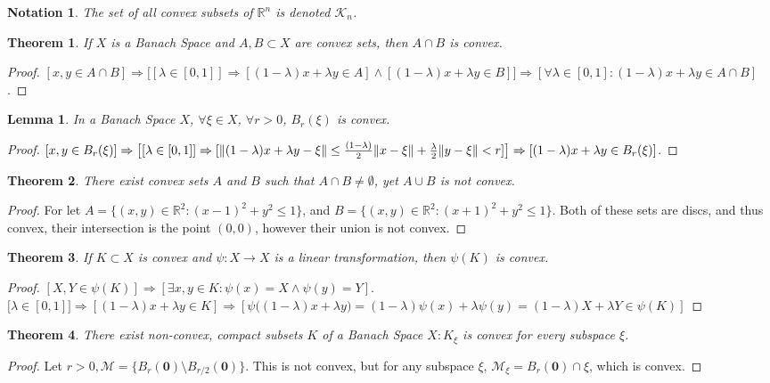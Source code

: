 \documentclass[12pt,oneside]{book}
\theoremstyle{mystyle}
\newtheorem{theorem}{Theorem}[section]
\newtheorem{lemma}{Lemma}[section]
\newtheorem{notation}{Notation}[section]
\begin{document}
\begin{notation}
The set of all convex subsets of $\mathbb{R}^n$ is denoted $\mathscr{K}_n$.
\end{notation}

\begin{theorem}
If $X$ is a Banach Space and $A,B\subset X$ are convex sets, then $A\cap B$ is convex.
\end{theorem}
\begin{proof}
$[x,y \in A\cap B] \Rightarrow \big[[\lambda \in [0,1]]\Rightarrow[ (1-\lambda)x+\lambda y \in A]\land [ (1-\lambda)x+\lambda y \in B]\big] \Rightarrow [\forall \lambda \in [0,1]:(1-\lambda)x+\lambda y \in A\cap B]$. 
\end{proof}

\begin{lemma}
In a Banach Space $X$, $\forall \xi \in X$, $\forall r>0$, $B_{r}(\xi)$ is convex.
\end{lemma}
\begin{proof}
$[x,y\in B_{r}(\xi)]\Rightarrow\big[[\lambda \in [0,1]]\Rightarrow [\norm{(1-\lambda)x+\lambda y-\xi}\leq \frac{(1-\lambda)}{2}\norm{x-\xi}+\frac{\lambda}{2} \norm{y-\xi}< r]\big]\Rightarrow [(1-\lambda)x+\lambda y \in B_{r}(\xi)]$.
\end{proof}

\begin{theorem}
There exist convex sets $A$ and $B$ such that $A\cap B \ne \emptyset$, yet $A\cup B$ is not convex.
\end{theorem}
\begin{proof}
For let $A = \{(x,y)\in \mathbb{R}^2: (x-1)^2+y^2\leq 1\}$, and $B = \{(x,y)\in \mathbb{R}^2:(x+1)^2+y^2\leq 1\}$. Both of these sets are discs, and thus convex, their intersection is the point $(0,0)$, however their union is not convex.
\end{proof}

\begin{theorem}
If $K\subset X$ is convex and $\psi:X\rightarrow X$ is a linear transformation, then $\psi(K)$ is convex.
\end{theorem}
\begin{proof}
$[X,Y\in \psi(K)]\Rightarrow [\exists x,y\in K:\psi(x)=X\land \psi(y)=Y]$. $\big[\lambda \in [0,1]\big]\Rightarrow [(1-\lambda)x+\lambda y\in K]\Rightarrow [\psi\big((1-\lambda)x+\lambda y\big)=(1-\lambda)\psi(x)+\lambda\psi(y) = (1-\lambda)X+\lambda Y \in \psi(K)]$
\end{proof}

\begin{theorem}
There exist non-convex, compact subsets $K$ of a Banach Space $X: K_{\xi}$ is convex for every subspace $\xi$.
\end{theorem}
\begin{proof}
Let $r>0, \mathcal{M} = \{B_{r}(\mathbf{0})\setminus B_{r/2}(\mathbf{0})\}$. This is not convex, but for any subspace $\xi$, $\mathcal{M}_{\xi} = B_{r}(\mathbf{0})\cap \xi$, which is convex.
\end{proof}
\end{document}
